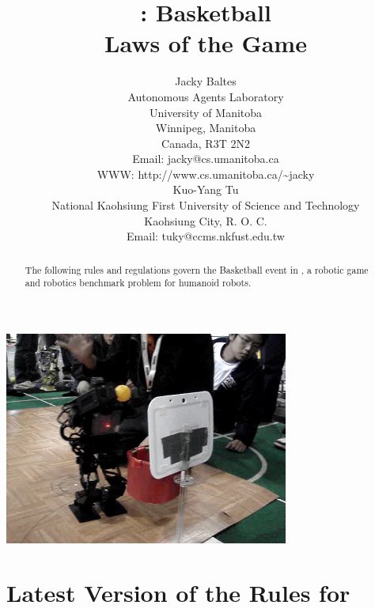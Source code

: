 \documentclass[12pt]{hurocup}
\begin{document}
\title{\HuroCup: Basketball\\
  Laws of the Game \thisyear}

\author{Jacky Baltes\\
Autonomous Agents Laboratory\\
University of Manitoba\\
Winnipeg, Manitoba\\
Canada, R3T 2N2\\
Email: jacky@cs.umanitoba.ca\\
WWW: http://www.cs.umanitoba.ca/\~{ }jacky\\[5mm]
Kuo-Yang Tu\\
National Kaohsiung First University of Science and Technology\\
Kaohsiung City, R. O. C.\\
Email: tuky@ccms.nkfust.edu.tw\\
}

\maketitle

\begin{center}
  \includegraphics[width=0.7\textwidth]{Figures/basketball-life}
\end{center}

\begin{abstract}
The following rules and regulations govern the Basketball event in
\HuroCup, a robotic game and robotics benchmark problem for humanoid
robots.
%
\end{abstract}

\section*{Latest Version of the Rules for \HuroCup}
\label{sec:updates}
\end{document}
